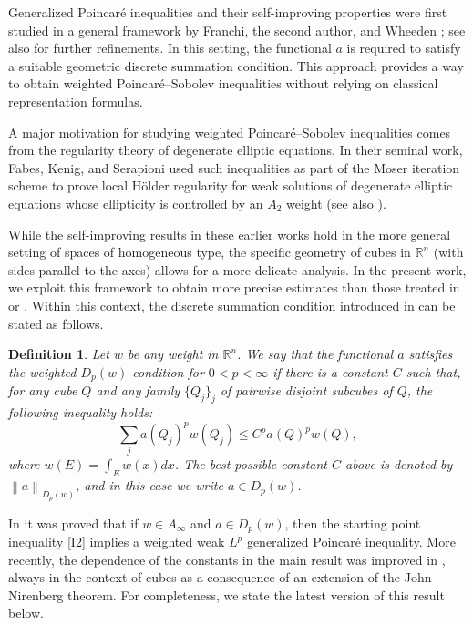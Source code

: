 \documentclass[reqno, 10pt, oneside]{amsart}
\numberwithin{equation}{section}
\newtheorem{definition}[theorem]{Definition}
\numberwithin{theorem}{section}
\newcommand{\R}{{\mathbb R}}
\newcommand{\1}{{\rm 1\hspace*{-0.4ex}%
\rule{0.1ex}{1.52ex}\hspace*{0.2ex}}}
\begin{document}
Generalized Poincaré inequalities and their self-improving properties were first studied in a general framework by Franchi, the second author, 
and Wheeden \cite{FPW98}; see also \cite{MP98, LernerPerez}  for further refinements. 
In this setting,   the functional $a$ is required to satisfy a suitable geometric discrete summation condition.
This approach provides a way to obtain weighted Poincaré--Sobolev inequalities without relying on classical representation formulas.




A major motivation for studying weighted Poincaré--Sobolev inequalities comes from the regularity theory of degenerate elliptic equations. In their seminal work, Fabes, Kenig, and Serapioni \cite{FKS} used such inequalities as part of the Moser iteration scheme to prove local Hölder regularity for weak solutions of degenerate elliptic equations whose ellipticity is controlled by an $A_2$ weight (see also \cite{HKM}).




While the self-improving results in these earlier works hold in the more general setting of spaces of homogeneous type, the specific geometry of cubes in $\mathbb{R}^n$ (with sides parallel to the axes) allows for a more delicate analysis. In the present work, we exploit this framework to obtain more precise estimates than those treated in \cite{FPW98} or \cite{MP98}. Within this context, the discrete summation condition introduced in \cite{FPW98} can be stated as follows.


\begin{definition}\label{DefDp}
	Let $w$ be any weight in $\R^n$. We say that the functional $a$ satisfies the weighted $D_p(w)$ condition for $0< p<\infty$ if there is a constant $C$ such that, for any cube $Q$ and any family $\{Q_j\}_j$ of pairwise disjoint subcubes of $Q$, the following inequality holds:
		\begin{equation*}
			\sum_j a(Q_j)^p w(Q_j)  \le C^p  a(Q)^p w(Q) ,
		\end{equation*}
		where $w(E)=\int_E w(x)dx$. The best possible constant $C$ above is denoted by $\left\| a \right\|_{D_p(w)} $, and in this case we write $a\in  D_p(w)$.
\end{definition}

In \cite{FPW98} it was proved that if $w\in A_\infty$ and $a\in D_p(w)$, then the starting point inequality \eqref{I2} implies a weighted weak $L^p$ generalized Poincaré inequality. More recently, the dependence of the constants in the main result was improved in \cite{CP}, always in the context of cubes as a consequence of an extension of the John--Nirenberg theorem. For completeness, we state the latest version of this result below.  
\end{document}
